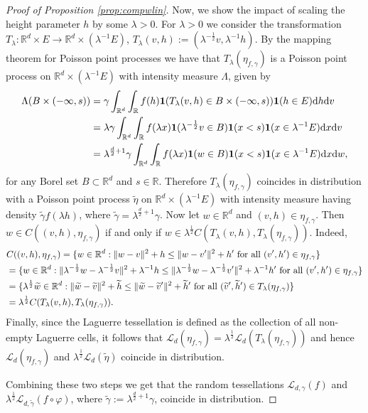 \documentclass[11pt,a4paper]{article}
\theoremstyle{plain}
\theoremstyle{definition}
\theoremstyle{remark}
\def\RR{\mathbb{R}}
\def\cL{\mathcal{L}}
\newcommand{\dd}{{\rm d}}
\begin{document}
\begin{proof}[Proof of Proposition \ref{prop:compwlin}]
    Now, we show the impact of scaling the height parameter $h$ by some $\lambda>0$. For $\lambda>0$ we consider the transformation $T_{\lambda}:\RR^d \times E \to\RR^d\times (\lambda^{-1}E)$, $T_{\lambda}(v,h):=(\lambda^{-\frac{1}{2}}v,\lambda^{-1}h)$. By the mapping theorem for Poisson point processes \cite[Theorem 5.1]{LP} we have that $T_{\lambda}(\eta_{f,\gamma})$ is a Poisson point process on $\RR^d\times(\lambda^{-1}E)$ with intensity measure $\Lambda$, given by
    \begin{align*}
      \Lambda(B\times (-\infty,s)) &= \gamma \int_{\RR^d} \int_{\RR} f(h) {\bf 1}(T_{\lambda}(v,h)\in B\times (-\infty,s)){\bf 1}(h\in E) \dd h \dd v\\
      &=\lambda\gamma \int_{\RR^d} \int_{\RR} f(\lambda x) {\bf 1}(\lambda^{-\frac{1}{2}}v\in B){\bf 1}(x< s){\bf 1}(x\in \lambda^{-1}E) \dd x \dd v\\
      &=\lambda^{\frac{d}{2}+1}\gamma \int_{\RR^d} \int_{\RR} f(\lambda x) {\bf 1}(w\in B){\bf 1}(x< s){\bf 1}(x\in \lambda^{-1}E) \dd x \dd w,
    \end{align*}
    for any Borel set $B\subset\RR^d$ and $s\in\RR$. Therefore $T_{\lambda}(\eta_{f,\gamma})$ coincides in distribution with a Poisson point process $\widetilde{\eta}$ on $\RR^d\times (\lambda^{-1}E)$ with intensity measure having density $\widetilde{\gamma}f(\lambda h)$, where $\widetilde{\gamma}=\lambda^{\frac{d}{2}+1}\gamma$. Now let $w\in \RR^d$ and $(v,h)\in\eta_{f,\gamma}$. Then $w\in C((v,h),\eta_{f,\gamma})$ if and only if $w\in \lambda^\frac{1}{2}C(T_{\lambda}(v,h),T_{\lambda}(\eta_{f,\gamma}))$. Indeed,
    \begin{align*}
        &C((v,h),\eta_{f,\gamma}) =\{w\in \RR^d: \|w-v\|^2+h \le \|w-v'\|^2+h'\,\, \text{for all } (v',h')\in \eta_{f,\gamma}\}\\
        &=\{w\in \RR^d: \|\lambda^{-\frac{1}{2}}w-\lambda^{-\frac{1}{2}}v\|^2+\lambda^{-1}h \le \|\lambda^{-\frac{1}{2}}w-\lambda^{-\frac{1}{2}}v'\|^2+\lambda^{-1}h'\,\, \text{for all } (v',h')\in \eta_{f,\gamma}\}\\
        &=\{\lambda^{1\over 2}\widetilde w\in \RR^d: \|\widetilde w-\widetilde{v}\|^2+\widetilde{h} \le \|\widetilde w-\widetilde{v}'\|^2+\widetilde{h}'\,\, \text{for all } (\widetilde{v}',\widetilde{h}')\in T_{\lambda}(\eta_{f,\gamma})\}\\
        &=\lambda^{\frac{1}{2}}C(T_{\lambda}(v,h),T_{\lambda}(\eta_{f,\gamma})).
    \end{align*}
    Finally, since the Laguerre tessellation is defined as the collection of all non-empty Laguerre cells, it follows that $\cL_d(\eta_{f,\gamma})=\lambda^{\frac{1}{2}}\cL_d(T_{\lambda}(\eta_{f,\gamma}))$ and hence $\cL_d(\eta_{f,\gamma})$ and $\lambda^{\frac{1}{2}}\cL_d(\widetilde{\eta})$ coincide in distribution. 
    
    Combining these two steps we get that the random tessellations $\cL_{d,\gamma}(f)$ and $\lambda^{\frac{1}{2}}\cL_{d,\widetilde{\gamma}}(f\circ \varphi)$, where $\widetilde{\gamma}:=\lambda^{\frac{d}{2}+1}\gamma$, coincide in distribution.
\end{proof}
\end{document}
